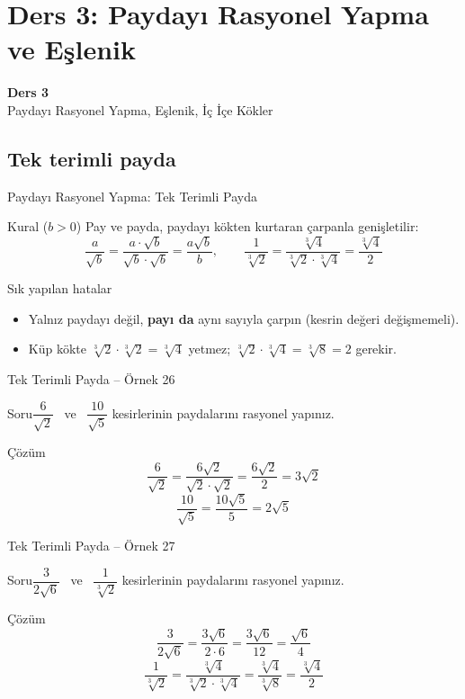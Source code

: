\documentclass[aspectratio=169,11pt]{beamer}
\newcommand{\soru}[3]{%
\begin{frame}{#1}
  \begin{block}{Soru}\large #2\end{block}
  \pause
  \begin{exampleblock}{Çözüm}\large #3\end{exampleblock}
\end{frame}}
\begin{document}
\section{Ders 3: Paydayı Rasyonel Yapma ve Eşlenik}
\begin{frame}
\centering\Large\color{anamavi}\textbf{Ders 3}\\[6pt]\normalsize Paydayı Rasyonel Yapma, Eşlenik, İç İçe Kökler
\end{frame}

\subsection{Tek terimli payda}
\begin{frame}{Paydayı Rasyonel Yapma: Tek Terimli Payda}
\begin{block}{Kural (\(b>0\))}
Pay ve payda, paydayı kökten kurtaran çarpanla genişletilir:
\[\frac{a}{\sqrt{b}}=\frac{a\cdot\sqrt b}{\sqrt b\cdot\sqrt b}=\frac{a\sqrt b}{b},\qquad \frac{1}{\sqrt[3]{2}}=\frac{\sqrt[3]{4}}{\sqrt[3]{2}\cdot\sqrt[3]{4}}=\frac{\sqrt[3]{4}}{2}\]
\end{block}
\begin{alertblock}{Sık yapılan hatalar}
\begin{itemize}
\item Yalnız paydayı değil, \textbf{payı da} aynı sayıyla çarpın (kesrin değeri değişmemeli).
\item Küp kökte \(\sqrt[3]{2}\cdot\sqrt[3]{2}=\sqrt[3]{4}\) yetmez; \(\sqrt[3]{2}\cdot\sqrt[3]{4}=\sqrt[3]{8}=2\) gerekir.
\end{itemize}
\end{alertblock}
\end{frame}

\soru{Tek Terimli Payda -- Örnek 26}
{\(\dfrac{6}{\sqrt2}\) \ ve \ \(\dfrac{10}{\sqrt5}\) kesirlerinin paydalarını rasyonel yapınız.}
{\[\frac{6}{\sqrt2}=\frac{6\sqrt2}{\sqrt2\cdot\sqrt2}=\frac{6\sqrt2}{2}=3\sqrt2\]
\[\frac{10}{\sqrt5}=\frac{10\sqrt5}{5}=2\sqrt5\]}

\soru{Tek Terimli Payda -- Örnek 27}
{\(\dfrac{3}{2\sqrt6}\) \ ve \ \(\dfrac{1}{\sqrt[3]{2}}\) kesirlerinin paydalarını rasyonel yapınız.}
{\[\frac{3}{2\sqrt6}=\frac{3\sqrt6}{2\cdot 6}=\frac{3\sqrt6}{12}=\frac{\sqrt6}{4}\]
\[\frac{1}{\sqrt[3]{2}}=\frac{\sqrt[3]{4}}{\sqrt[3]{2}\cdot\sqrt[3]{4}}=\frac{\sqrt[3]{4}}{\sqrt[3]{8}}=\frac{\sqrt[3]{4}}{2}\]}
\end{document}
